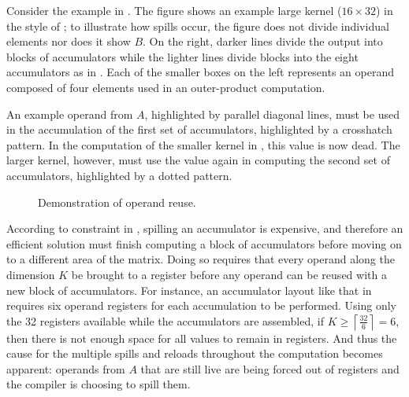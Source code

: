 \documentclass[\main/thesis.tex]{subfiles}
\begin{document}
Consider the example in .
The figure shows an example large kernel ($16 \times 32$) in the style of ; to illustrate how spills occur, the figure does not divide individual elements nor does it show $B$.
On the right, darker lines divide the output into blocks of accumulators while the lighter lines divide blocks into the eight accumulators as in .
Each of the smaller boxes on the left represents an operand composed of four  elements used in an outer-product computation.

An example operand from $A$, highlighted by parallel diagonal lines, must be used in the accumulation of the first set of accumulators, highlighted by a crosshatch pattern.
In the computation of the smaller kernel in , this value is now \gls{dead}.
The larger kernel, however, must use the value again in computing the second set of accumulators, highlighted by a dotted pattern.

\begin{figure}[t]
  \centering
  \caption{Demonstration of operand reuse.}
  \label{fig:opReuse}
\end{figure}

According to constraint  in , spilling an accumulator is expensive, and therefore an efficient solution must finish computing a block of accumulators before moving on to a different area of the matrix.
Doing so requires that every operand along the dimension $K$ be brought to a register before any operand can be reused with a new block of accumulators.
For instance, an accumulator layout like that in  requires six operand registers for each accumulation to be performed.
Using only the 32 registers available while the accumulators are assembled, if $K \geq \left\lceil \frac{32}{6} \right\rceil = 6$, then there is not enough space for all values to remain in registers.
And thus the cause for the multiple spills and reloads throughout the computation becomes apparent: operands from $A$ that are still \gls{live} are being forced out of registers and the compiler is choosing to spill them.\footnotemark
{}
\end{document}
